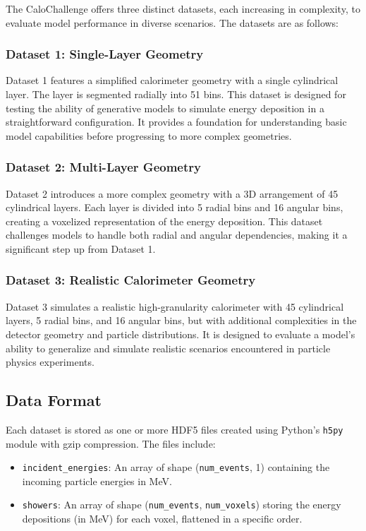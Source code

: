 The CaloChallenge offers three distinct datasets, each increasing in complexity, to evaluate model performance in diverse scenarios. The datasets are as follows:

\subsubsection{Dataset 1: Single-Layer Geometry}
Dataset 1 features a simplified calorimeter geometry with a single cylindrical layer. The layer is segmented radially into 51 bins. This dataset is designed for testing the ability of generative models to simulate energy deposition in a straightforward configuration. It provides a foundation for understanding basic model capabilities before progressing to more complex geometries.

\subsubsection{Dataset 2: Multi-Layer Geometry}
Dataset 2 introduces a more complex geometry with a 3D arrangement of 45 cylindrical layers. Each layer is divided into 5 radial bins and 16 angular bins, creating a voxelized representation of the energy deposition. This dataset challenges models to handle both radial and angular dependencies, making it a significant step up from Dataset 1.

\subsubsection{Dataset 3: Realistic Calorimeter Geometry}
Dataset 3 simulates a realistic high-granularity calorimeter with 45 cylindrical layers, 5 radial bins, and 16 angular bins, but with additional complexities in the detector geometry and particle distributions. It is designed to evaluate a model's ability to generalize and simulate realistic scenarios encountered in particle physics experiments.

\subsection{Data Format}

Each dataset is stored as one or more HDF5 files created using Python's \texttt{h5py} module with gzip compression. The files include:

\begin{itemize}
    \item \texttt{incident\_energies}: An array of shape (\texttt{num\_events}, 1) containing the incoming particle energies in MeV.
    \item \texttt{showers}: An array of shape (\texttt{num\_events}, \texttt{num\_voxels}) storing the energy depositions (in MeV) for each voxel, flattened in a specific order.
\end{itemize}

